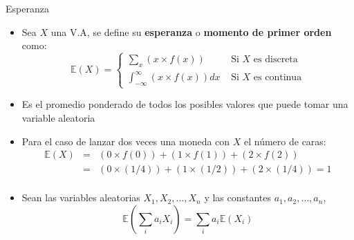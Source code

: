 \documentclass[handout]{beamer}
\begin{document}
\begin{frame}{Esperanza}
\scriptsize{
\begin{itemize}
 \item Sea $X$ una V.A, se define su \textbf{esperanza} o \textbf{momento de primer orden} como:
  \begin{displaymath}
  \mathbb{E}(X) = \left\{ \begin{array}{rl}
  \sum_{x}(x\times f(x)) &\mbox{ Si $X$ es discreta} \\
   \int_{-\infty}^{\infty}(x\times f(x))dx &\mbox{ Si $X$ es continua}
       \end{array} \right.
  \end{displaymath}
\item Es el promedio ponderado de todos los posibles valores que puede tomar una variable aleatoria

\item Para el caso de lanzar dos veces una moneda con $X$ el número de caras:
 \begin{eqnarray*}
  \mathbb{E}(X) & = & (0 \times f(0)) + (1 \times f(1)) + (2 \times f(2)) \nonumber \\
       & = & (0 \times (1/4)) + (1 \times (1/2)) + (2 \times (1/4)) =1  \nonumber \\
 \end{eqnarray*}


\item Sean las variables aleatorias $X_1, X_2, \dots , X_n$ y las constantes $a_1, a_2, \dots, a_n$,
\begin{displaymath}
 \mathbb{E}\left(\sum_{i}a_i X_i \right) = \sum_{i} a_{i} \mathbb{E}(X_i)
\end{displaymath}
 


\end{itemize}
}

\end{frame}
\end{document}
